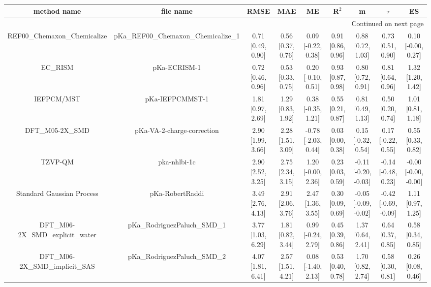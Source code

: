 \documentclass{article}
\begin{document}
\begin{center}
\scriptsize
\begin{longtable}{|ccccccccc|}
\toprule
                   method name &                             file name &               RMSE &                MAE &                   ME &              R$^2$ &                     m &                $\tau$ &                    ES \\
\midrule
\endhead
\midrule
\multicolumn{9}{r}{{Continued on next page}} \\
\midrule
\endfoot

\bottomrule
\endlastfoot
    REF00_Chemaxon_Chemicalize &  pKa\_REF00\_Chemaxon\_Chemicalize\_1 &  0.71 [0.49, 0.90] &  0.56 [0.37, 0.76] &   0.09 [-0.22, 0.38] &  0.91 [0.86, 0.96] &     0.88 [0.72, 1.03] &     0.73 [0.51, 0.90] &    0.10 [-0.00, 0.27] \\
                       EC_RISM &                          pKa-ECRISM-1 &  0.72 [0.46, 0.96] &  0.53 [0.33, 0.75] &   0.20 [-0.10, 0.51] &  0.93 [0.87, 0.98] &     0.80 [0.72, 0.91] &     0.81 [0.64, 0.96] &     1.32 [1.20, 1.42] \\
                    IEFPCM/MST &                       pKa-IEFPCMMST-1 &  1.81 [0.97, 2.69] &  1.29 [0.83, 1.92] &   0.38 [-0.35, 1.21] &  0.55 [0.21, 0.87] &     0.81 [0.49, 1.13] &     0.50 [0.20, 0.74] &     1.01 [0.81, 1.18] \\
                DFT_M05-2X_SMD &            pKa-VA-2-charge-correction &  2.90 [1.99, 3.66] &  2.28 [1.51, 3.09] &  -0.78 [-2.03, 0.44] &  0.03 [0.00, 0.38] &    0.15 [-0.32, 0.54] &    0.17 [-0.22, 0.55] &     0.55 [0.33, 0.82] \\
                       TZVP-QM &                          pka-nhlbi-1c &  2.90 [2.52, 3.25] &  2.75 [2.34, 3.15] &   1.20 [-0.00, 2.36] &  0.23 [0.03, 0.59] &  -0.11 [-0.20, -0.03] &   -0.14 [-0.48, 0.23] &  -0.00 [-0.00, -0.00] \\
     Standard Gaussian Process &                       pKa-RobertRaddi &  3.49 [2.76, 4.13] &  2.91 [2.06, 3.76] &    2.47 [1.36, 3.55] &  0.30 [0.09, 0.69] &  -0.05 [-0.09, -0.02] &  -0.42 [-0.69, -0.09] &     1.11 [0.97, 1.25] \\
 DFT_M06-2X_SMD_explicit_water &          pKa\_RodriguezPaluch\_SMD\_1 &  3.77 [1.03, 6.29] &  1.81 [0.82, 3.44] &   0.99 [-0.24, 2.79] &  0.45 [0.39, 0.86] &     1.37 [0.64, 2.41] &     0.64 [0.37, 0.85] &     0.58 [0.34, 0.85] \\
   DFT_M06-2X_SMD_implicit_SAS &          pKa\_RodriguezPaluch\_SMD\_2 &  4.07 [1.81, 6.41] &  2.57 [1.51, 4.21] &   0.08 [-1.40, 2.13] &  0.53 [0.40, 0.78] &     1.70 [0.82, 2.74] &     0.58 [0.30, 0.81] &     0.26 [0.08, 0.46] \\

\end{longtable}
\end{center}
\end{document}
